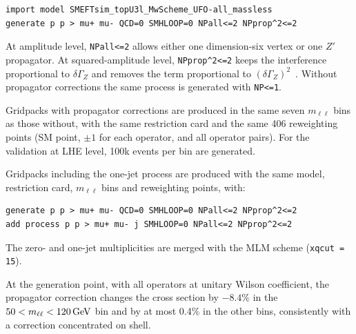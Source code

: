 \begin{verbatim}
import model SMEFTsim_topU3l_MwScheme_UFO-all_massless
generate p p > mu+ mu- QCD=0 SMHLOOP=0 NPall<=2 NPprop^2<=2
\end{verbatim}

\noindent At amplitude level, \texttt{NPall<=2} allows either one dimension-six
vertex or one $Z'$ propagator. At squared-amplitude level, \texttt{NPprop\^{}2<=2}
keeps the interference proportional to $\delta\Gamma_Z$ and removes the term
proportional to $(\delta\Gamma_Z)^2$~\cite{Brivio:2020onw}. Without propagator
corrections the same process is generated with \texttt{NP<=1}.

Gridpacks with propagator corrections are produced in the same seven
$m_{\ell\ell}$ bins as those without, with the same restriction card and the same
406 reweighting points (SM point, $\pm1$ for each operator, and all operator
pairs). For the validation at LHE level, 100k events per bin are generated.

Gridpacks including the one-jet process are produced with the same model,
restriction card, $m_{\ell\ell}$ bins and reweighting points, with:

\begin{verbatim}
generate p p > mu+ mu- QCD=0 SMHLOOP=0 NPall<=2 NPprop^2<=2
add process p p > mu+ mu- j SMHLOOP=0 NPall<=2 NPprop^2<=2
\end{verbatim}

\noindent The zero- and one-jet multiplicities are merged with the MLM scheme
(\texttt{xqcut = 15}\GeV).


At the generation point, with all operators at unitary Wilson coefficient, the
propagator correction changes the cross section by $-8.4\%$ in the
$50 < m_{\ell\ell} < 120\,\text{Ge\hspace{-.08em}V}$ bin and by at most 0.4\% in the other bins,
consistently with a correction concentrated on shell.

